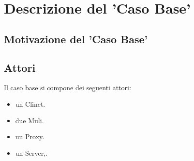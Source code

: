 \documentclass[13pt,a4paper]{article}
\begin{document}
	
	\section{Descrizione del 'Caso Base'}
	\subsection{Motivazione del 'Caso Base'} 
	
	\subsection{Attori}
	Il caso base si compone dei seguenti attori: 
	\begin{itemize}
		\item un Clinet.
		\item due Muli.
		\item un Proxy.
		\item un Server,.
	\end{itemize}
	
\end{document}
